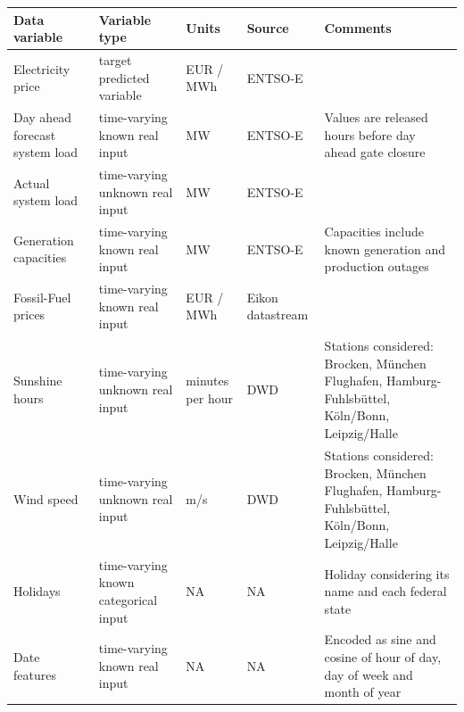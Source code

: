 \documentclass[a4paper]{article}
\begin{document}
{\fontsize{8pt}{10pt}\selectfont\begin{longtable}[]{@{}
  >{\raggedright\arraybackslash}p{}
  >{\raggedright\arraybackslash}p{}
  >{\raggedright\arraybackslash}p{}
  >{\raggedright\arraybackslash}p{}
  >{\raggedright\arraybackslash}p{}@{}}
\toprule\noalign{}
\begin{minipage}[b]{\linewidth}\raggedright
Data variable
\end{minipage} & \begin{minipage}[b]{\linewidth}\raggedright
Variable type
\end{minipage} & \begin{minipage}[b]{\linewidth}\raggedright
Units
\end{minipage} & \begin{minipage}[b]{\linewidth}\raggedright
Source
\end{minipage} & \begin{minipage}[b]{\linewidth}\raggedright
Comments
\end{minipage} \\
\midrule\noalign{}
\endhead
\bottomrule\noalign{}
\endlastfoot
Electricity price & target predicted variable & EUR / MWh & ENTSO-E & \\
Day ahead forecast system load & time-varying known real input & MW &
ENTSO-E & Values are released hours before day ahead gate closure \\
Actual system load & time-varying unknown real input & MW & ENTSO-E & \\
Generation capacities & time-varying known real input & MW & ENTSO-E &
Capacities include known generation and production outages \\
Fossil-Fuel prices & time-varying known real input & EUR / MWh & Eikon
datastream & \\
Sunshine hours & time-varying unknown real input & minutes per hour &
DWD & Stations considered: Brocken, München Flughafen,
Hamburg-Fuhlsbüttel, Köln/Bonn, Leipzig/Halle \\
Wind speed & time-varying unknown real input & m/s & DWD & Stations
considered: Brocken, München Flughafen, Hamburg-Fuhlsbüttel, Köln/Bonn,
Leipzig/Halle \\
Holidays & time-varying known categorical input & NA & NA & Holiday
considering its name and each federal state \\
Date features & time-varying known real input & NA & NA & Encoded as
sine and cosine of hour of day, day of week and month of year \\
\end{longtable}}
\end{document}
